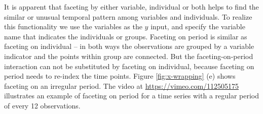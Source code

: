 \documentclass[12pt]{article}
\begin{document}
\begin{itemize}
It is apparent that faceting by either variable, individual or both
helps to find the similar or unusual temporal pattern among variables
and individuals. To realize this functionality we use the variables
as the $y$ input, and specify the variable name that indicates the individuals
or groups. Faceting on period is similar as faceting on individual
-- in both ways the observations are grouped by a variable indicator
and the points within group are connected. But the faceting-on-period
interaction can not be substituted by faceting on individual, because
faceting on period needs to re-index the time points. Figure
\ref{fig:x-wrapping} (e) shows faceting on an irregular period.
The video at \url{https://vimeo.com/112505175} illustrates an example
of faceting on period for a time series with a regular period of every
12 observations.





\end{itemize}
\end{document}
